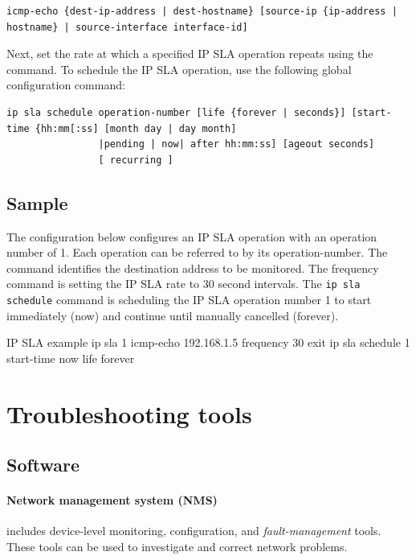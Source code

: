 \begin{verbatim}
icmp-echo {dest-ip-address | dest-hostname} [source-ip {ip-address | hostname} | source-interface interface-id] 
\end{verbatim}

Next, set the rate at which a specified IP SLA operation repeats using the  command. To schedule the IP SLA operation, use the following global configuration command:

\begin{verbatim}
ip sla schedule operation-number [life {forever | seconds}] [start-time {hh:mm[:ss] [month day | day month] 
                |pending | now| after hh:mm:ss] [ageout seconds] 
                [ recurring ] 
\end{verbatim}

\subsection{Sample}

The configuration below configures an IP SLA operation with an operation number of 1.  Each operation can be referred to by its operation-number. The  command identifies the destination address to be monitored. The frequency command is setting the IP SLA rate to 30 second intervals. The \verb|ip sla schedule| command is scheduling the IP SLA operation number 1 to start immediately (now) and continue until manually cancelled (forever).

\begin{sexylisting}{IP SLA example}
ip sla 1
  icmp-echo 192.168.1.5
  frequency 30
  exit
ip sla schedule 1 start-time now life forever
\end{sexylisting}

\section{Troubleshooting tools}

\subsection{Software}

\paragraph{Network management system (NMS)}includes device-level monitoring, configuration, and \emph{fault-management} tools.  These tools can be used to investigate and correct network problems.

